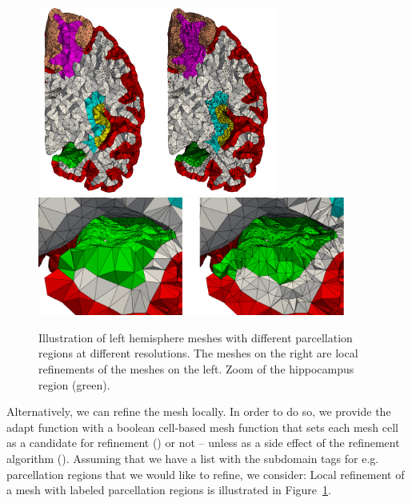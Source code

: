 \begin{figure}[t]	
  \begin{center}
    \includegraphics[width=0.7\textwidth]{./chapters/chp4/FIG/fenics-parcellation-crinkle.png} \\
    \includegraphics[width=0.9\textwidth]{./chapters/chp4/FIG/parcellations_refine_zoom.png}
  \end{center}
  \caption{Illustration of left hemisphere meshes with different
    parcellation regions at different resolutions. The meshes on the
    right are local refinements of the meshes on the left. Zoom of the
    hippocampus region (green).}
  \label{fig:chp4:fenics-parc}
\end{figure}
Alternatively, we can refine the mesh locally. In order to do so, we
provide the adapt function with a boolean cell-based mesh function
that sets each mesh cell as a candidate for refinement () or
not -- unless as a side effect of the refinement algorithm
(). Assuming that we have a list  with the
subdomain tags for e.g. parcellation regions that we would like to
refine, we consider:
Local refinement of a mesh with labeled parcellation regions is
illustrated in Figure~\ref{fig:chp4:fenics-parc}.

